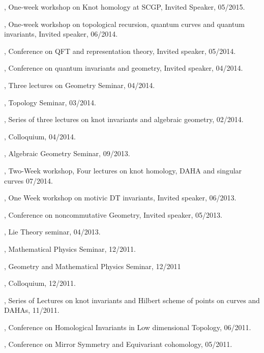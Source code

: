 \documentclass[11pt]{amsart}
\theoremstyle{plain}
\theoremstyle{definition}
\theoremstyle{remark}
\begin{document}
, One-week workshop on Knot homology at SCGP, Invited Speaker, 05/2015. 

,  One-week workshop on topological recursion, quantum curves and quantum invariants, Invited speaker, 06/2014. 

, Conference on QFT and representation theory, Invited speaker, 05/2014.

, Conference on quantum invariants and geometry, Invited speaker, 04/2014.

, Three lectures on Geometry Seminar, 04/2014.

, Topology Seminar, 03/2014.

, Series of three lectures on knot invariants and algebraic geometry, 02/2014.

, Colloquium, 04/2014.

, Algebraic Geometry Seminar, 09/2013.

, Two-Week workshop, Four lectures on knot homology, DAHA and singular curves 07/2014.

, {One Week workshop on motivic DT invariants}, Invited speaker, 06/2013.

, {Conference on noncommutative Geometry}, Invited speaker, 05/2013.

, Lie Theory seminar, 04/2013.

, Mathematical Physics Seminar, 12/2011.

, Geometry and Mathematical Physics Seminar, 12/2011

, Colloquium, 12/2011.

, Series of Lectures on knot invariants and Hilbert scheme of points
on curves and DAHAs, 11/2011.

, Conference on Homological Invariants in Low dimensional 
Topology, 06/2011.

, Conference on Mirror Symmetry and Equivariant 
cohomology, 05/2011.
\end{document}
